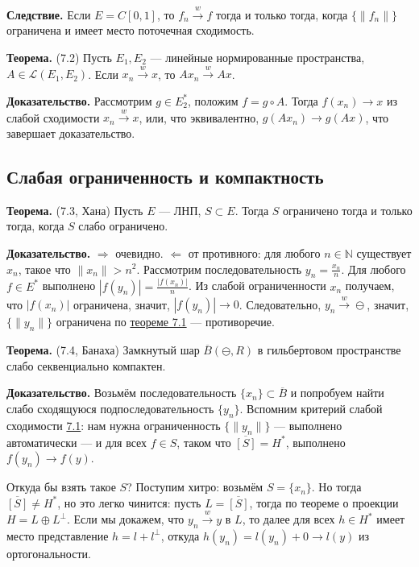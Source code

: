 \textbf{Следствие.} Если $E = C[0, 1]$, то $f_n \xrightarrow{w} f$ тогда и только тогда, когда $\{\|f_n\|\}$ ограничена и имеет место поточечная сходимость.

\label{th:7-2} \textbf{Теорема.} (7.2) Пусть $E_1, E_2$ --- линейные нормированные пространства, $A \in \mathcal L(E_1, E_2)$.
Если $x_n \xrightarrow{w} x$, то $Ax_n \xrightarrow{w} Ax$.

\textbf{Доказательство.} Рассмотрим $g \in E_2^*$, положим $f = g \circ A$.
Тогда $f(x_n) \to x$ из слабой сходимости $x_n \xrightarrow{w} x$, или, что эквивалентно, $g(Ax_n) \to g(Ax)$, что завершает доказательство.

\QED

\subsection{Слабая ограниченность и компактность}
\label{th:7-3} \textbf{Теорема.} (7.3, Хана) Пусть $E$ --- ЛНП, $S \subset E$.
Тогда $S$ ограничено тогда и только тогда, когда $S$ слабо ограничено.

\textbf{Доказательство.} $\Rightarrow$ очевидно. $\Leftarrow$ от противного: для любого $n \in \mathbb N$ существует $x_n$, такое что $\|x_n\| > n^2$.
Рассмотрим последовательность $y_n = \frac{x_n}{n}$.
Для любого $f \in E^*$ выполнено $|f(y_n)| = \frac{|f(x_n)|}{n}$.
Из слабой ограниченности $x_n$ получаем, что $|f(x_n)|$ ограничена, значит, $|f(y_n)| \to 0$.
Следовательно, $y_n \xrightarrow{w} \ominus$, значит, $\{\|y_n\|\}$ ограничена по \hyperref[th:7-1]{теореме 7.1} --- противоречие.

\QED

\label{th:7-4} \textbf{Теорема.} (7.4, Банаха) Замкнутый шар $\overline B(\ominus, R)$ в гильбертовом пространстве слабо секвенциально компактен.

\textbf{Доказательство.} Возьмём последовательность $\{x_n\} \subset \overline B$ и попробуем найти слабо сходящуюся подпоследовательность $\{y_n\}$.
Вспомним критерий слабой сходимости \hyperref[th:7-1]{7.1}: нам нужна ограниченность $\{\|y_n\|\}$ --- выполнено автоматически --- и для всех $f \in S$, таком что $\overline{[S]} = H^*$, выполнено $f(y_n) \to f(y)$.

Откуда бы взять такое $S$?
Поступим хитро: возьмём $S = \{x_n\}$.
Но тогда $\overline{[S]} \ne H^*$, но это легко чинится: пусть $L = \overline{[S]}$, тогда по теореме о проекции $H = L \oplus L^\bot$.
Если мы докажем, что $y_n \xrightarrow{w} y$ в $L$, то далее для всех $h \in H^*$ имеет место представление $h = l + l^\bot$, откуда $h(y_n) = l(y_n) + 0 \to l(y)$ из ортогональности.

